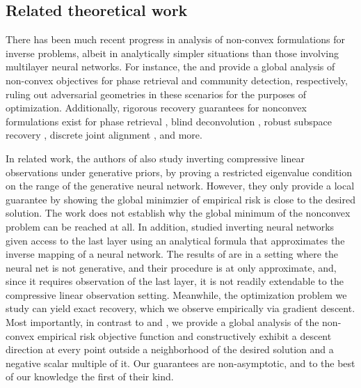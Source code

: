 \documentclass[final,12pt]{colt2018}
\begin{document}
\subsection{Related theoretical work}
There has been much recent progress in analysis of non-convex formulations for inverse problems, albeit in analytically simpler situations than those involving multilayer neural networks. For instance, the \cite{WrightPR} and \cite{Burer1} provide a global analysis of non-convex objectives for phase retrieval and community detection, respectively, ruling out adversarial geometries in these scenarios for the purposes of optimization.  Additionally, rigorous recovery guarantees for nonconvex formulations exist for phase retrieval \citep{wirtinger, chen2015solving}, blind deconvolution \citep{li2016rapid, ma2017implicit,  huang2017blind}, robust subspace recovery \citep{maunu2017well}, discrete joint alignment \citep{chen2016projected}, and more.   

In related work, the authors of \cite{Price} also study inverting compressive linear observations under generative priors, by proving a restricted eigenvalue condition on the range of the generative neural network. However, they only provide a local guarantee by showing the global minimzier of empirical risk is close to the desired solution.  The work does not establish why the global minimum of the nonconvex problem can be reached at all.   In addition, \cite{Sanjeev} studied inverting neural networks given access to the last layer using an analytical formula that approximates the inverse mapping of a neural network. The results of \cite{Sanjeev} are in a setting where the neural net is not generative, and their procedure is at only approximate, and, since it requires observation of the last layer, it is not readily extendable to the compressive linear observation setting. Meanwhile, the optimization problem we study can yield exact recovery, which we observe empirically via gradient descent. Most importantly, in contrast to \cite{Price} and \cite{Sanjeev}, we provide a global analysis of the non-convex empirical risk objective function and constructively exhibit a descent direction at every point outside a neighborhood of the desired solution and a negative scalar multiple of it. Our guarantees are non-asymptotic, and to the best of our knowledge the first of their kind.
\end{document}
